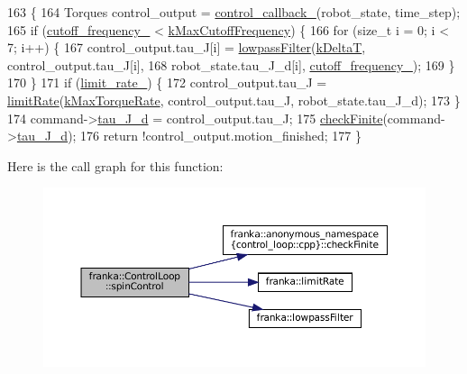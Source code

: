 \begin{DoxyCode}
163                                                                                     \{
164   Torques control\_output = \hyperlink{classfranka_1_1ControlLoop_a71249c690ee56b2c099bbb4f29e92c95}{control\_callback\_}(robot\_state, time\_step);
165   \textcolor{keywordflow}{if} (\hyperlink{classfranka_1_1ControlLoop_a1c01098536341d3e1da2617a08129529}{cutoff\_frequency\_} < \hyperlink{namespacefranka_adb10b364af8deb9e17d9bcc1ff2695be}{kMaxCutoffFrequency}) \{
166     \textcolor{keywordflow}{for} (\textcolor{keywordtype}{size\_t} i = 0; i < 7; i++) \{
167       control\_output.tau\_J[i] = \hyperlink{namespacefranka_a94c21b0e87afce0147a9cd6025c239ca}{lowpassFilter}(\hyperlink{namespacefranka_a1e207a0d5a6e90c1e1a78e6e1057120a}{kDeltaT}, control\_output.tau\_J[i],
168                                               robot\_state.tau\_J\_d[i], 
      \hyperlink{classfranka_1_1ControlLoop_a1c01098536341d3e1da2617a08129529}{cutoff\_frequency\_});
169     \}
170   \}
171   \textcolor{keywordflow}{if} (\hyperlink{classfranka_1_1ControlLoop_a660f32d739c7f7ed05fa97b06220b98b}{limit\_rate\_}) \{
172     control\_output.tau\_J = \hyperlink{namespacefranka_a77e127a920da5b0ad29877ec3ff29f15}{limitRate}(\hyperlink{namespacefranka_a6c1a0e9a5e1f375d2aad61edac907d4e}{kMaxTorqueRate}, control\_output.tau\_J, 
      robot\_state.tau\_J\_d);
173   \}
174   command->\hyperlink{structresearch__interface_1_1robot_1_1ControllerCommand_a55f1abde5337f7ba6f170c8b7d8f89aa}{tau\_J\_d} = control\_output.tau\_J;
175   \hyperlink{namespacefranka_1_1anonymous__namespace_02control__loop_8cpp_03_af284e9c97573a00e6fc31f0c716d6add}{checkFinite}(command->\hyperlink{structresearch__interface_1_1robot_1_1ControllerCommand_a55f1abde5337f7ba6f170c8b7d8f89aa}{tau\_J\_d});
176   \textcolor{keywordflow}{return} !control\_output.motion\_finished;
177 \}
\end{DoxyCode}
Here is the call graph for this function\+:
\nopagebreak
\begin{figure}[H]
\begin{center}
\leavevmode
\includegraphics[width=350pt]{classfranka_1_1ControlLoop_a480c19a57bf2a7df4ab9c6f68667b865_cgraph}
\end{center}
\end{figure}
